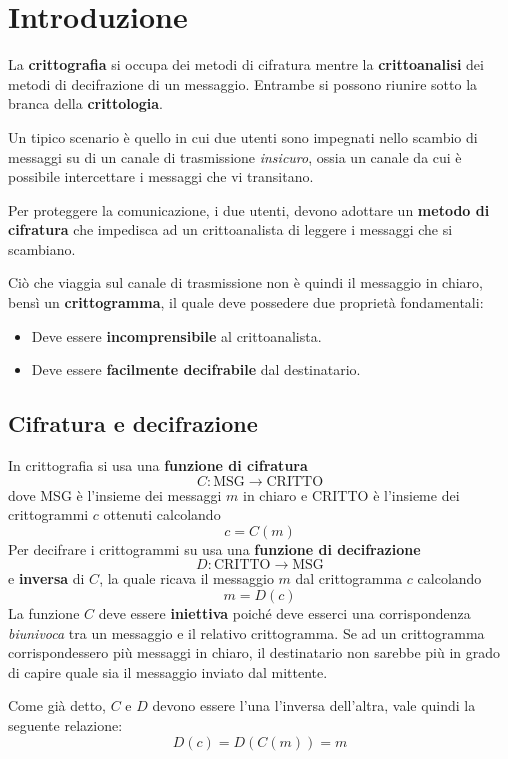 \chapter{Introduzione}\label{intro}
La \textbf{crittografia} si occupa dei metodi di cifratura mentre la \textbf{crittoanalisi} dei metodi di decifrazione
di un messaggio. Entrambe si possono riunire sotto la branca della \textbf{crittologia}.

Un tipico scenario \`e quello in cui due utenti sono impegnati nello scambio di messaggi su di un canale di trasmissione
\emph{insicuro}, ossia un canale da cui \`e possibile intercettare i messaggi che vi transitano.

Per proteggere la comunicazione, i due utenti, devono adottare un \textbf{metodo di cifratura} che impedisca ad un
crittoanalista di leggere i messaggi che si scambiano.

Ci\`o che viaggia sul canale di trasmissione non \`e quindi il messaggio in chiaro, bens\`i un \textbf{crittogramma},
il quale deve possedere due propriet\`a fondamentali:
\begin{itemize}
	\item Deve essere \textbf{incomprensibile} al crittoanalista.
	\item Deve essere \textbf{facilmente decifrabile} dal destinatario.
\end{itemize}

\section{Cifratura e decifrazione}\label{cifratura}
In crittografia si usa una \textbf{funzione di cifratura}
\[ C : \text{MSG} \rightarrow \text{CRITTO} \]
dove MSG \`e l'insieme dei messaggi $m$ in chiaro e CRITTO \`e l'insieme dei crittogrammi $c$ ottenuti calcolando
\[ c = C(m) \]
Per decifrare i crittogrammi su usa una \textbf{funzione di decifrazione}
\[ D : \text{CRITTO} \rightarrow \text{MSG} \]
e \textbf{inversa} di $C$, la quale ricava il messaggio $m$ dal crittogramma $c$ calcolando
\[ m = D(c) \]
La funzione $C$ deve essere \textbf{iniettiva} poich\'e deve esserci una corrispondenza \emph{biunivoca} tra un
messaggio e il relativo crittogramma. Se ad un crittogramma corrispondessero pi\`u messaggi in chiaro, il destinatario
non sarebbe pi\`u in grado di capire quale sia il messaggio inviato dal mittente.

Come gi\`a detto, $C$ e $D$ devono essere l'una l'inversa dell'altra, vale quindi la seguente relazione:
\[ D(c) = D(C(m)) = m \]

